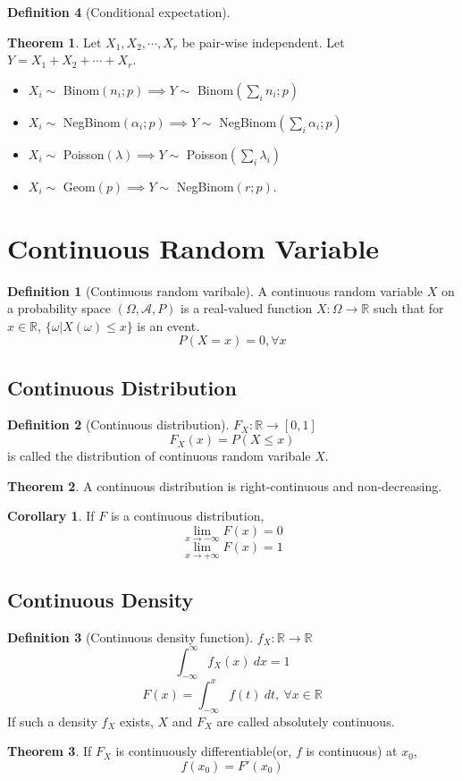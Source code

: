 \documentclass[10pt, a4paper]{extarticle}
\theoremstyle{definition}
\newtheorem{thm}{Theorem}
\newtheorem{cor}{Corollary}[thm]
\newtheorem{defn}{Definition}
\begin{document}
\begin{defn}[Conditional expectation]
	\begin{thm}
		Let $X_1,X_2,\cdots,X_r$ be pair-wise independent. Let $Y=X_1+X_2+\cdots+X_r$.
		\begin{itemize}
			\item $X_i\sim$ Binom$(n_i;p)\implies Y\sim$ Binom$(\sum_i n_i;p)$
			\item $X_i\sim$ NegBinom$(\alpha_i;p)\implies Y\sim$ NegBinom$(\sum_i\alpha_i;p)$
			\item $X_i\sim$ Poisson$(\lambda)\implies Y\sim$ Poisson$(\sum_i\lambda_i)$
			\item $X_i\sim$ Geom$(p)\implies Y\sim$ NegBinom$(r;p)$.
		\end{itemize}
	\end{thm}

	\section{Continuous Random Variable}
	\begin{defn}[Continuous random varibale]
		A continuous random variable $X$ on a probability space $(\Omega,\mathscr{A},P)$ is a real-valued function $X:\Omega\to\mathbb{R}$ such that for $x\in\mathbb{R}$, $\{\omega|X(\omega)\leq x\}$ is an event.
		\[P(X=x)=0,\forall x\]
	\end{defn}
	\subsection{Continuous Distribution}
	\begin{defn}[Continuous distribution]
		$F_X:\mathbb{R}\to[0,1]$
		\[F_X(x)=P(X\leq x)\]
		is called the distribution of continuous random varibale $X$.
	\end{defn}
	\begin{thm}
		A continuous distribution is right-continuous and non-decreasing.
	\end{thm}
	\begin{cor}
		If $F$ is a continuous distribution,
		\[\lim_{x\to{-\infty}}F(x)=0\]
		\[\lim_{x\to{+\infty}}F(x)=1\]
	\end{cor}
	\subsection{Continuous Density}
	\begin{defn}[Continuous density function]
		$f_X:\mathbb{R}\to\mathbb{R}$
		\[\int_{-\infty}^\infty f_X(x)\ dx=1\]
		\[F(x)=\int_{-\infty}^x f(t)\ dt,\ \forall x\in\mathbb{R}\]
		If such a density $f_X$ exists, $X$ and $F_X$ are called absolutely continuous.
	\end{defn}
	\begin{thm}
		If $F_X$ is continuously differentiable(or, $f$ is continuous) at $x_0$,
		\[f(x_0)=F'(x_0)\]
	\end{thm}
	

\end{defn}
\end{document}
